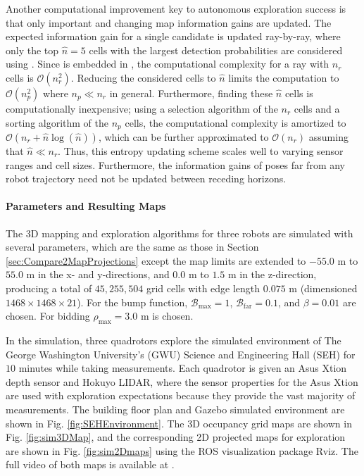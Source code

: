 Another computational improvement key to autonomous exploration success is that only important and changing map information gains are updated. The expected information gain for a single candidate is updated ray-by-ray, where only the top $\hat{n}=5$ cells with the largest detection probabilities are considered using . Since  is embedded in , the computational complexity for a ray with $n_{r}$ cells is $\mathcal O(n_{r}^2)$. Reducing the considered cells to $\hat{n}$ limits the computation to $\mathcal O(n_{p}^2)$ where $n_{p}\ll n_r$ in general. Furthermore, finding these $\hat{n}$ cells is computationally inexpensive; using a selection algorithm of the $n_{r}$ cells and a sorting algorithm of the $n_{p}$ cells, the computational complexity is amortized to $\mathcal O(n_r+\hat{n}\log(\hat{n}))$, which can be further approximated to $\mathcal O(n_r)$ assuming that $\hat{n}\ll n_r$. Thus, this entropy updating scheme scales well to varying sensor ranges and cell sizes. Furthermore, the information gains of poses far from any robot trajectory need not be updated between receding horizons.


\paragraph{Parameters and Resulting Maps}
The 3D mapping and exploration algorithms for three robots are simulated with several parameters, which are the same as those in Section \ref{sec:Compare2MapProjections} except the map limits are extended to $-55.0$ m to $55.0$ m in the x- and y-directions, and $0.0$ m to $1.5$ m in the z-direction, producing a total of $45,255,504$ grid cells with edge length $0.075$ m (dimensioned $1468\times1468\times21$). For the bump function, $\mathcal B_\text{max}=1$, $\mathcal B_\text{far}=0.1$, and $\beta=0.01$ are chosen. For bidding $\rho_\text{max}=3.0$ m is chosen.



In the simulation, three quadrotors explore the simulated environment of The George Washington University's (GWU) Science and Engineering Hall (SEH) for $10$ minutes while taking measurements. Each quadrotor is given an Asus Xtion depth sensor and Hokuyo LIDAR, where the sensor properties for the Asus Xtion are used with exploration expectations because they provide the vast majority of measurements. The building floor plan and Gazebo simulated environment are shown in Fig. \ref{fig:SEHEnvironment}. The 3D occupancy grid maps are shown in Fig. \ref{fig:sim3DMap}, and the corresponding 2D projected maps for exploration are shown in Fig. \ref{fig:sim2Dmaps} using the ROS visualization package Rviz. The full video of both maps is available at \href{https://youtu.be/OMn2c453oik}{}.


